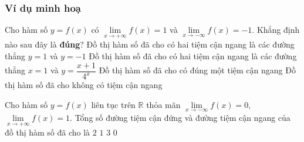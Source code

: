 \subsubsection{Ví dụ minh hoạ}
\begin{vd} %
	Cho hàm số $y=f(x)$ có $\lim\limits_{x\to+\infty} f(x)=1$ và $\lim\limits_{x\to-\infty} f(x)=-1$. Khẳng định nào sau đây là \textbf{đúng}?
	\choice
	{\True Đồ thị hàm số đã cho có hai tiệm cận ngang là các đường thẳng $y=1$ và $y=-1$}
	{Đồ thị hàm số đã cho có hai tiệm cận ngang là các đường thẳng $x=1$ và $y=\dfrac{x+1}{4^x}$}
	{Đồ thị hàm số đã cho có đúng một tiệm cận ngang}
	{Đồ thị hàm số đã cho không có tiệm cận ngang}
\end{vd}	
\begin{vd} %
	Cho hàm số $y=f(x)$ liên tục trên $\mathbb{R}$ thỏa mãn $\lim\limits_{x\to-\infty} f(x)=0$, $\lim\limits_{x\to+\infty} f(x)=1$. Tổng số đường tiệm cận đứng và đường tiệm cận ngang của đồ thị hàm số đã cho là
	\choice
	{\True $2$}
	{$1$}
	{$3$}
	{$0$}
\end{vd}	
		
